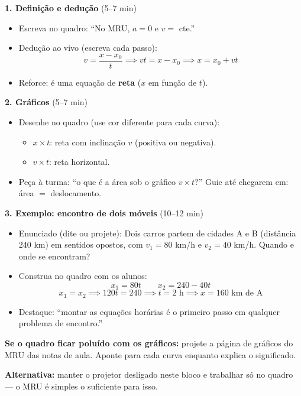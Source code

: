 \documentclass[12pt,a4paper]{article}
\begin{document}
\begin{tcolorbox}[quadrobox]
  \textbf{1. Defini\c{c}\~ao e dedu\c{c}\~ao} (5--7 min)
  \begin{itemize}[nosep]
    \item Escreva no quadro: ``No MRU, $a = 0$ e $v = $ cte.''
    \item Dedu\c{c}\~ao ao vivo (escreva cada passo):
    \[
      v = \frac{x - x_0}{t} \implies vt = x - x_0 \implies
      \boxed{x = x_0 + vt}
    \]
    \item Reforce: \'e uma equa\c{c}\~ao de \textbf{reta} ($x$ em fun\c{c}\~ao de $t$).
  \end{itemize}

  \medskip
  \textbf{2. Gr\'aficos} (5--7 min)
  \begin{itemize}[nosep]
    \item Desenhe no quadro (use cor diferente para cada curva):
      \begin{itemize}[nosep]
        \item $x \times t$: reta com inclina\c{c}\~ao $v$ (positiva ou negativa).
        \item $v \times t$: reta horizontal.
      \end{itemize}
    \item Peça \`a turma: ``o que \'e a \'area sob o gr\'afico $v \times t$?''
          Guie at\'e chegarem em: \'area $=$ deslocamento.
  \end{itemize}

  \medskip
  \textbf{3. Exemplo: encontro de dois m\'oveis} (10--12 min)
  \begin{itemize}[nosep]
    \item Enunciado (dite ou projete):
          Dois carros partem de cidades A e B (distância 240 km)
          em sentidos opostos, com $v_1 = 80$ km/h e $v_2 = 40$ km/h.
          Quando e onde se encontram?
    \item Construa no quadro com os alunos:
    \[
      x_1 = 80t \qquad x_2 = 240 - 40t
    \]
    \[
      x_1 = x_2 \implies 120t = 240 \implies t = 2 \text{ h}
      \implies x = 160 \text{ km de A}
    \]
    \item Destaque: ``montar as equa\c{c}\~oes hor\'arias \'e o primeiro
          passo em qualquer problema de encontro.''
  \end{itemize}
\end{tcolorbox}

\begin{tcolorbox}[projetorbox]
  \textbf{Se o quadro ficar poluído com os gráficos:}
  projete a p\'agina de gr\'aficos do MRU das notas de aula.
  Aponte para cada curva enquanto explica o significado.

  \medskip
  \textbf{Alternativa:} manter o projetor desligado neste bloco e
  trabalhar s\'o no quadro --- o MRU \'e simples o suficiente para isso.
\end{tcolorbox}
\end{document}
